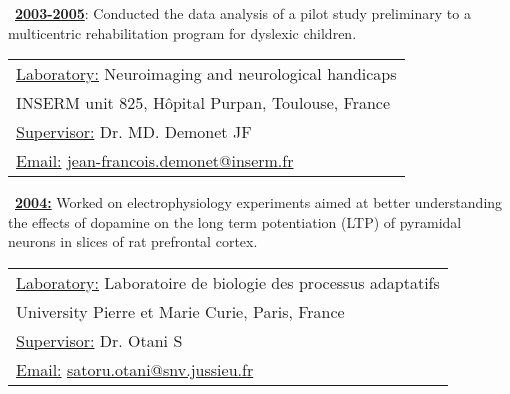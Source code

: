 \begin{minipage}[c]{7.7cm}
    \textbullet~\underline{\textbf{2003-2005}}: Conducted the data analysis of a pilot study preliminary to a multicentric rehabilitation program for dyslexic children.
\end{minipage}
\hfill
\begin{minipage}[c]{10cm}
    \setlength\minrowclearance{0.2cm}
    \setlength\arrayrulewidth{1.5pt}
    \small
    \begin{tabular}[t]{|l|}\hline
        \underline{Laboratory:} Neuroimaging and neurological handicaps\\
        INSERM unit 825, Hôpital Purpan, Toulouse, France\\
        \underline{Supervisor:} Dr. MD. Demonet JF\\
        \underline{Email:} \href{mailto:jean-francois.demonet@inserm.fr}{jean-francois.demonet@inserm.fr}\\
        \hline
    \end{tabular}
\end{minipage}

\begin{minipage}[c]{6.7cm}
    \textbullet~\underline{\textbf{2004:}}	Worked on electrophysiology experiments aimed at better understanding the effects of dopamine on the long term potentiation (LTP) of pyramidal neurons in slices of rat prefrontal cortex.
\end{minipage}
\hspace{3mm}
\begin{minipage}[c]{\textwidth}
    \setlength\minrowclearance{0.1cm}
    \setlength\arrayrulewidth{1.5pt}
    \small
    \begin{tabular}[c]{|l|}\hline
        \underline{Laboratory:} Laboratoire de biologie des processus adaptatifs\\
        University Pierre et Marie Curie, Paris, France\\
        \underline{Supervisor:} Dr. Otani S\\
        \underline{Email:} \href{mailto:satoru.otani@snv.jussieu.fr}{satoru.otani@snv.jussieu.fr}\\ \hline
    \end{tabular}
\end{minipage}

